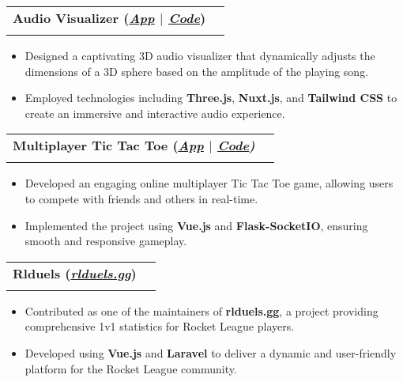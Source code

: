 \documentclass[a4paper,10pt]{article}
\makeatletter
\newcommand{\resumeSubheading}[4]{
  \vspace{-1pt}\item
    \begin{tabular*}{0.97\textwidth}[t]{l@{\extracolsep{\fill}}r}
      \textbf{#1} & #2 \\
      \textit{\normalsize#3} & \textit{\normalsize #4} \\
    \end{tabular*}\vspace{-7pt}
}
\makeatother
\begin{document}
\resumeSubheading
{Audio Visualizer (\textit{\href{https://audio-visualizer-threejs.netlify.app/}{\textbf{\underline{App}}} $|$ \href{https://github.com/AnkushSarkar10/audio_vis_threejs}{\textbf{\underline{Code}}}})}{}{}{}
\vspace{-15pt}
\begin{itemize}
  \item Designed a captivating 3D audio visualizer that dynamically adjusts the dimensions of a 3D sphere based on the amplitude of the playing song.
  \item Employed technologies including \textbf{Three.js}, \textbf{Nuxt.js}, and \textbf{Tailwind CSS} to create an immersive and interactive audio experience.
\end{itemize}
\vspace{-5pt}

\resumeSubheading
{Multiplayer Tic Tac Toe (\textit{\href{https://vue-flask-tic-tac-toe.web.app/}{\textbf{\underline{App}}} $|$ \href{https://github.com/AnkushSarkar10/vue-flask-tic-tac-toe}{\textbf{\underline{Code}}})}}{}{}{}
\vspace{-15pt}
\begin{itemize}
  \item Developed an engaging online multiplayer Tic Tac Toe game, allowing users to compete with friends and others in real-time.
  \item Implemented the project using \textbf{Vue.js} and \textbf{Flask-SocketIO}, ensuring smooth and responsive gameplay.
\end{itemize}
\vspace{-5pt}

\resumeSubheading
{Rlduels (\textit{\href{https://rlduels.gg/}{\textbf{\underline{rlduels.gg}}}})}{}
{}{}
\vspace{-15pt}
\begin{itemize}
  \item Contributed as one of the maintainers of \textbf{rlduels.gg}, a project providing comprehensive 1v1 statistics for Rocket League players.
  \item Developed using \textbf{Vue.js} and \textbf{Laravel} to deliver a dynamic and user-friendly platform for the Rocket League community.
\end{itemize}
\vspace{-5pt}

\end{document}
